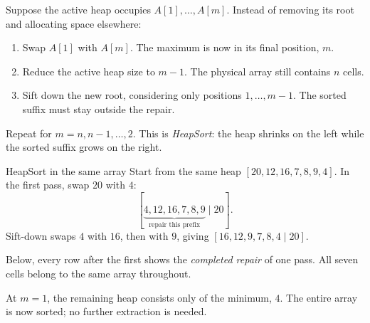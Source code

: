 \documentclass[a4paper,12pt,oneside]{report}
\begin{document}
Suppose the active heap occupies $A[1],\ldots,A[m]$.
Instead of removing its root and allocating space elsewhere:
\begin{enumerate}
  \item Swap $A[1]$ with $A[m]$. The maximum is now in its final
    position, $m$.
  \item Reduce the active heap size to $m-1$. The physical array
    still contains $n$ cells.
  \item Sift down the new root, considering only positions
    $1,\ldots,m-1$. The sorted suffix must stay outside the repair.
\end{enumerate}
Repeat for $m=n,n-1,\ldots,2$. This is \emph{HeapSort}:
the heap shrinks on the left while the sorted suffix grows on the right.

\begin{framedexample}{HeapSort in the same array}
Start from the same heap $[20,12,16,7,8,9,4]$.
In the first pass, swap $20$ with $4$:
\[
[\underbrace{4,12,16,7,8,9}_{\text{repair this prefix}}\mid20].
\]
Sift-down swaps $4$ with $16$, then with $9$, giving
$[16,12,9,7,8,4\mid20]$.

Below, every row after the first shows the \emph{completed repair}
of one pass. All seven cells belong to the same array throughout.
\begin{center}
\end{center}
At $m=1$, the remaining heap consists only of the minimum, $4$.
The entire array is now sorted; no further extraction is needed.
\end{framedexample}
\end{document}
